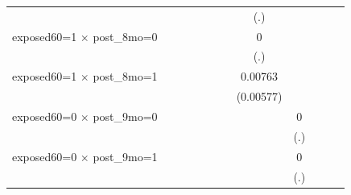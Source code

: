 \begin{table}[htbp]
\begin{tabular}{l*{11}{c}}
                    &                     &                     &                     &                     &                     &                     &         (.)         &                     &                     &                     &                     \\
\addlinespace
exposed60=1 $\times$ post\_8mo=0&                     &                     &                     &                     &                     &                     &           0         &                     &                     &                     &                     \\
                    &                     &                     &                     &                     &                     &                     &         (.)         &                     &                     &                     &                     \\
\addlinespace
exposed60=1 $\times$ post\_8mo=1&                     &                     &                     &                     &                     &                     &     0.00763         &                     &                     &                     &                     \\
                    &                     &                     &                     &                     &                     &                     &   (0.00577)         &                     &                     &                     &                     \\
\addlinespace
exposed60=0 $\times$ post\_9mo=0&                     &                     &                     &                     &                     &                     &                     &           0         &                     &                     &                     \\
                    &                     &                     &                     &                     &                     &                     &                     &         (.)         &                     &                     &                     \\
\addlinespace
exposed60=0 $\times$ post\_9mo=1&                     &                     &                     &                     &                     &                     &                     &           0         &                     &                     &                     \\
                    &                     &                     &                     &                     &                     &                     &                     &         (.)         &                     &                     &                     \\

\end{tabular}
\end{table}
